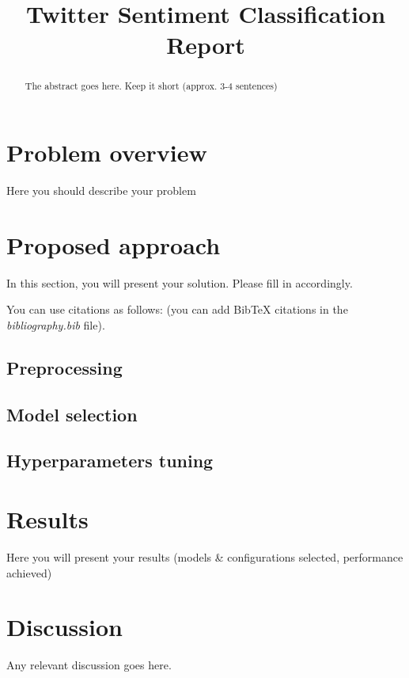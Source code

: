 \documentclass[conference]{IEEEtran}
\begin{document}
\title{Twitter Sentiment Classification Report}

\author{
\and
{}
}

\maketitle

\begin{abstract}
The abstract goes here. Keep it short (approx. 3-4 sentences)
\end{abstract}

\section{Problem overview}
Here you should describe your problem

\section{Proposed approach}
In this section, you will present your solution. Please fill in accordingly.

You can use citations as follows: \cite{goodfellow2016deep} (you can add BibTeX citations in the \textit{bibliography.bib} file).

\subsection{Preprocessing}
\subsection{Model selection}
\subsection{Hyperparameters tuning}

\section{Results}
Here you will present your results (models \& configurations selected, performance achieved)

\section{Discussion}
Any relevant discussion goes here.



\end{document}
